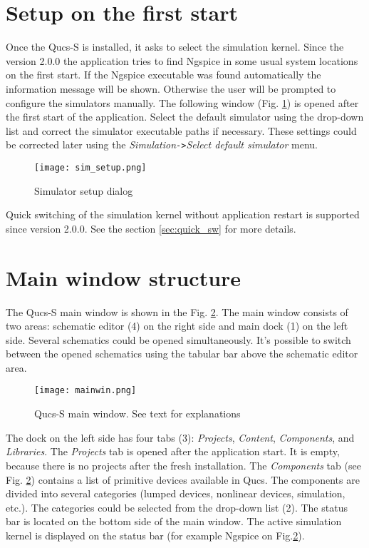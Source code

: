 \section{Setup on the first start}

Once the Qucs-S is installed, it asks to select the simulation kernel. Since the version 2.0.0 the application tries to find Ngspice in some usual system locations on the first start. If the Ngspice executable was found automatically the information message will be shown. Otherwise the user will be prompted to configure the simulators manually. The following window (Fig. \ref{fig:sim_setup}) is opened after the first start  of the application. Select the default simulator using the drop-down list and correct the simulator executable paths if necessary. These settings could be corrected later using the \textit{Simulation}\verb|->|\textit{Select default simulator} menu.

\begin{figure}[!ht]
  \begin{center}
    \texttt{[image: sim\_setup.png]}
  \end{center}
  \caption{Simulator setup dialog} \label{fig:sim_setup}
\end{figure}

Quick switching of the simulation kernel without application restart is supported since version 2.0.0. See the section \ref{sec:quick_sw} for more details.

\section{Main window structure}

The Qucs-S main window is shown in the Fig. \ref{fig:mainwin}. The main window consists of two areas: schematic editor (4) on the right side and main dock (1) on the left side. Several schematics could be opened simultaneously. It's possible to switch between the opened schematics using the tabular bar above the schematic editor area.

\begin{figure}[!ht]
  \begin{center}
    \texttt{[image: mainwin.png]}
  \end{center}
  \caption{Qucs-S main window. See text for explanations} \label{fig:mainwin}
\end{figure}

The dock on the left side has four tabs (3): \emph{Projects}, \emph{Content}, \emph{Components}, and \emph{Libraries}. The \emph{Projects} tab is opened after the application start. It is empty, because there is no projects after the fresh installation. The \emph{Components} tab (see Fig. \ref{fig:mainwin}) contains a list of primitive devices available in Qucs. The components are divided into several categories (lumped devices, nonlinear devices, simulation, etc.). The categories could be selected from the drop-down list (2). The status bar is located on the bottom side of the main window. The active simulation kernel is displayed on the status bar (for example Ngspice on Fig.\ref{fig:mainwin}).

